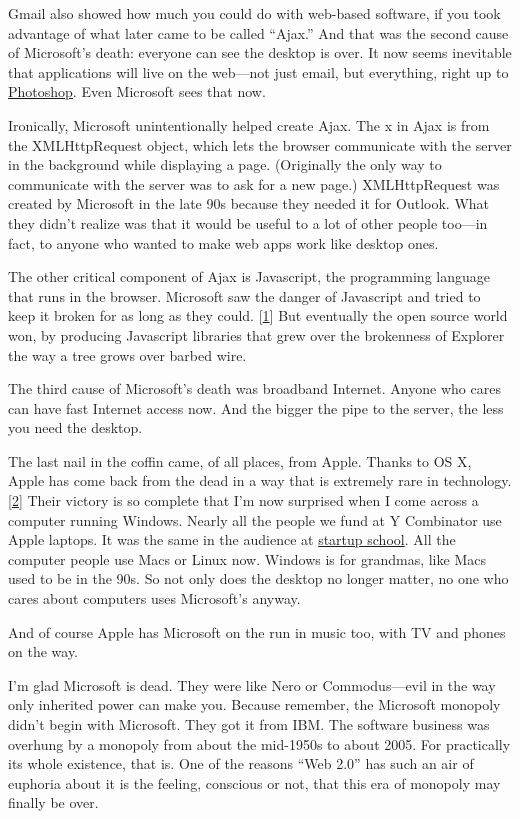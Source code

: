 Gmail also showed how much you could do with web-based software, if you
took advantage of what later came to be called ``Ajax.'' And that was
the second cause of Microsoft's death: everyone can see the desktop is
over. It now seems inevitable that applications will live on the
web---not just email, but everything, right up to
\href{http://snipshot.com}{Photoshop}. Even Microsoft sees that now.

Ironically, Microsoft unintentionally helped create Ajax. The x in Ajax
is from the XMLHttpRequest object, which lets the browser communicate
with the server in the background while displaying a page. (Originally
the only way to communicate with the server was to ask for a new page.)
XMLHttpRequest was created by Microsoft in the late 90s because they
needed it for Outlook. What they didn't realize was that it would be
useful to a lot of other people too---in fact, to anyone who wanted to
make web apps work like desktop ones.

The other critical component of Ajax is Javascript, the programming
language that runs in the browser. Microsoft saw the danger of
Javascript and tried to keep it broken for as long as they could.
{[}\hyperref[f1n]{1}{]} But eventually the open source world won, by
producing Javascript libraries that grew over the brokenness of Explorer
the way a tree grows over barbed wire.

The third cause of Microsoft's death was broadband Internet. Anyone who
cares can have fast Internet access now. And the bigger the pipe to the
server, the less you need the desktop.

The last nail in the coffin came, of all places, from Apple. Thanks to
OS X, Apple has come back from the dead in a way that is extremely rare
in technology. {[}\hyperref[f2n]{2}{]} Their victory is so complete that
I'm now surprised when I come across a computer running Windows. Nearly
all the people we fund at Y Combinator use Apple laptops. It was the
same in the audience at
\href{http://www.bosstalks.com/StartupSchool2007/all_macs_and_all_writing.jpg}{startup
school}. All the computer people use Macs or Linux now. Windows is for
grandmas, like Macs used to be in the 90s. So not only does the desktop
no longer matter, no one who cares about computers uses Microsoft's
anyway.

And of course Apple has Microsoft on the run in music too, with TV and
phones on the way.

I'm glad Microsoft is dead. They were like Nero or Commodus---evil in
the way only inherited power can make you. Because remember, the
Microsoft monopoly didn't begin with Microsoft. They got it from IBM.
The software business was overhung by a monopoly from about the
mid-1950s to about 2005. For practically its whole existence, that is.
One of the reasons ``Web 2.0'' has such an air of euphoria about it is
the feeling, conscious or not, that this era of monopoly may finally be
over.

